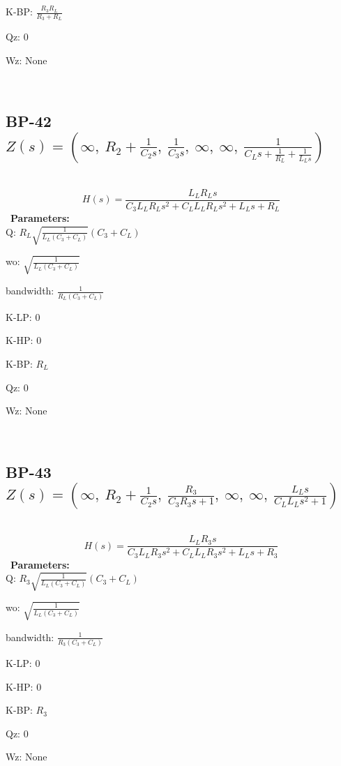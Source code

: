 \documentclass{article}
\begin{document}
K-BP: $\frac{R_{3} R_{L}}{R_{3} + R_{L}}$\ 

Qz: $0$\ 

Wz: $\text{None}$\ 

\ 

\subsection{BP-42 $Z(s) = \left( \infty, \  R_{2} + \frac{1}{C_{2} s}, \  \frac{1}{C_{3} s}, \  \infty, \  \infty, \  \frac{1}{C_{L} s + \frac{1}{R_{L}} + \frac{1}{L_{L} s}}\right)$ } \ 
\textbf{\[H(s) = \frac{L_{L} R_{L} s}{C_{3} L_{L} R_{L} s^{2} + C_{L} L_{L} R_{L} s^{2} + L_{L} s + R_{L}}\] } \ 
\textbf{Parameters:}\\ 

Q: $R_{L} \sqrt{\frac{1}{L_{L} \left(C_{3} + C_{L}\right)}} \left(C_{3} + C_{L}\right)$\ 

wo: $\sqrt{\frac{1}{L_{L} \left(C_{3} + C_{L}\right)}}$\ 

bandwidth: $\frac{1}{R_{L} \left(C_{3} + C_{L}\right)}$\ 

K-LP: $0$\ 

K-HP: $0$\ 

K-BP: $R_{L}$\ 

Qz: $0$\ 

Wz: $\text{None}$\ 

\ 

\subsection{BP-43 $Z(s) = \left( \infty, \  R_{2} + \frac{1}{C_{2} s}, \  \frac{R_{3}}{C_{3} R_{3} s + 1}, \  \infty, \  \infty, \  \frac{L_{L} s}{C_{L} L_{L} s^{2} + 1}\right)$ } \ 
\textbf{\[H(s) = \frac{L_{L} R_{3} s}{C_{3} L_{L} R_{3} s^{2} + C_{L} L_{L} R_{3} s^{2} + L_{L} s + R_{3}}\] } \ 
\textbf{Parameters:}\\ 

Q: $R_{3} \sqrt{\frac{1}{L_{L} \left(C_{3} + C_{L}\right)}} \left(C_{3} + C_{L}\right)$\ 

wo: $\sqrt{\frac{1}{L_{L} \left(C_{3} + C_{L}\right)}}$\ 

bandwidth: $\frac{1}{R_{3} \left(C_{3} + C_{L}\right)}$\ 

K-LP: $0$\ 

K-HP: $0$\ 

K-BP: $R_{3}$\ 

Qz: $0$\ 

Wz: $\text{None}$\ 
\end{document}
